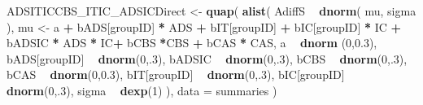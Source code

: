 \documentclass[10pt,dvipsnames,enabledeprecatedfontcommands]{scrartcl}
\newenvironment{Shaded}{\begin{snugshade}}{\end{snugshade}}
\newcommand{\KeywordTok}[1]{\textcolor[rgb]{0.13,0.29,0.53}{\textbf{#1}}}
\newcommand{\DataTypeTok}[1]{\textcolor[rgb]{0.13,0.29,0.53}{#1}}
\newcommand{\DecValTok}[1]{\textcolor[rgb]{0.00,0.00,0.81}{#1}}
\newcommand{\FloatTok}[1]{\textcolor[rgb]{0.00,0.00,0.81}{#1}}
\newcommand{\StringTok}[1]{\textcolor[rgb]{0.31,0.60,0.02}{#1}}
\newcommand{\OperatorTok}[1]{\textcolor[rgb]{0.81,0.36,0.00}{\textbf{#1}}}
\newcommand{\NormalTok}[1]{#1}
\begin{document}
\begin{Shaded}
\begin{Highlighting}[]
\NormalTok{ADSITICCBS_ITIC_ADSICDirect <-}\StringTok{ }\KeywordTok{quap}\NormalTok{(}
  \KeywordTok{alist}\NormalTok{(}
\NormalTok{    AdiffS }\OperatorTok{~}\StringTok{ }\KeywordTok{dnorm}\NormalTok{( mu, sigma ),}
\NormalTok{    mu <-}\StringTok{ }\NormalTok{a }\OperatorTok{+}\StringTok{ }\NormalTok{bADS[groupID] }\OperatorTok{*}\StringTok{ }\NormalTok{ADS }\OperatorTok{+}\StringTok{  }\NormalTok{bIT[groupID] }\OperatorTok{+}\StringTok{ }\NormalTok{bIC[groupID] }\OperatorTok{*}\StringTok{ }\NormalTok{IC }\OperatorTok{+}\StringTok{ }
\StringTok{      }\NormalTok{bADSIC }\OperatorTok{*}\StringTok{ }\NormalTok{ADS }\OperatorTok{*}\StringTok{ }\NormalTok{IC}\OperatorTok{+}\StringTok{ }\NormalTok{bCBS }\OperatorTok{*}\NormalTok{CBS }\OperatorTok{+}\StringTok{ }\NormalTok{bCAS }\OperatorTok{*}\StringTok{ }\NormalTok{CAS,}
\NormalTok{    a }\OperatorTok{~}\StringTok{ }\KeywordTok{dnorm}\NormalTok{ (}\DecValTok{0}\NormalTok{,}\FloatTok{0.3}\NormalTok{),}
\NormalTok{    bADS[groupID] }\OperatorTok{~}\StringTok{ }\KeywordTok{dnorm}\NormalTok{(}\DecValTok{0}\NormalTok{,.}\DecValTok{3}\NormalTok{),}
\NormalTok{    bADSIC }\OperatorTok{~}\StringTok{ }\KeywordTok{dnorm}\NormalTok{(}\DecValTok{0}\NormalTok{,.}\DecValTok{3}\NormalTok{),}
\NormalTok{    bCBS }\OperatorTok{~}\StringTok{ }\KeywordTok{dnorm}\NormalTok{(}\DecValTok{0}\NormalTok{,.}\DecValTok{3}\NormalTok{),}
\NormalTok{    bCAS }\OperatorTok{~}\StringTok{ }\KeywordTok{dnorm}\NormalTok{(}\DecValTok{0}\NormalTok{,}\FloatTok{0.3}\NormalTok{),}
\NormalTok{    bIT[groupID] }\OperatorTok{~}\StringTok{ }\KeywordTok{dnorm}\NormalTok{(}\DecValTok{0}\NormalTok{,.}\DecValTok{3}\NormalTok{),}
\NormalTok{    bIC[groupID] }\OperatorTok{~}\StringTok{ }\KeywordTok{dnorm}\NormalTok{(}\DecValTok{0}\NormalTok{,.}\DecValTok{3}\NormalTok{),}
\NormalTok{    sigma  }\OperatorTok{~}\StringTok{ }\KeywordTok{dexp}\NormalTok{(}\DecValTok{1}\NormalTok{)}
\NormalTok{  ), }
  \DataTypeTok{data =}\NormalTok{ summaries}
\NormalTok{)}



\end{Highlighting}
\end{Shaded}
\end{document}
